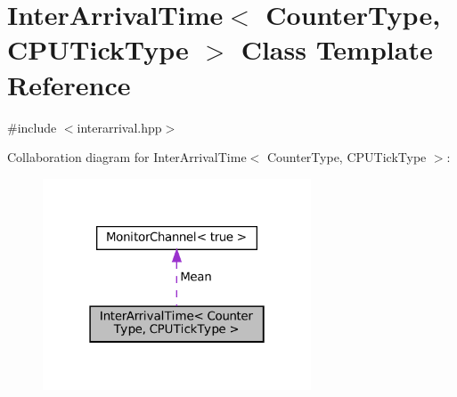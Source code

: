\hypertarget{classInterArrivalTime}{}\section{Inter\+Arrival\+Time$<$ Counter\+Type, C\+P\+U\+Tick\+Type $>$ Class Template Reference}
\label{classInterArrivalTime}


{\ttfamily \#include $<$interarrival.\+hpp$>$}



Collaboration diagram for Inter\+Arrival\+Time$<$ Counter\+Type, C\+P\+U\+Tick\+Type $>$\+:
\nopagebreak
\begin{figure}[H]
\begin{center}
\leavevmode
\includegraphics[width=226pt]{classInterArrivalTime__coll__graph}
\end{center}
\end{figure}
